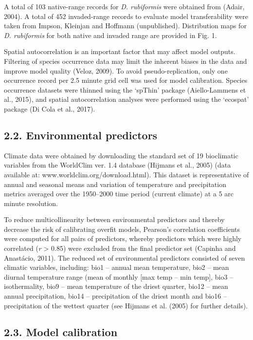 \documentclass[12pt,]{article}
\begin{document}
A total of 103 native-range records for \emph{D. rubiformis} were
obtained from (Adair, 2004). A total of 452 invaded-range records to
evaluate model transferability were taken from Impson, Kleinjan and
Hoffmann (unpublished). Distribution maps for \emph{D. rubiformis} for
both native and invaded range are provided in Fig. 1.

Spatial autocorrelation is an important factor that may affect model
outputs. Filtering of species occurrence data may limit the inherent
biases in the data and improve model quality (Veloz, 2009). To avoid
pseudo-replication, only one occurrence record per 2.5 minute grid cell
was used for model calibration. Species occurrence datasets were thinned
using the `spThin' package (Aiello-Lammens et al., 2015), and spatial
autocorrelation analyses were performed using the `ecospat' package (Di
Cola et al., 2017).

\hypertarget{environmental-predictors}{%
\subsection{2.2. Environmental
predictors}\label{environmental-predictors}}

Climate data were obtained by downloading the standard set of 19
bioclimatic variables from the WorldClim ver. 1.4 database (Hijmans et
al., 2005) (data available at: www.worldclim.org/download.html). This
dataset is representative of annual and seasonal means and variation of
temperature and precipitation metrics averaged over the 1950--2000 time
period (current climate) at a 5 arc minute resolution.

To reduce multicollinearity between environmental predictors and thereby
decrease the risk of calibrating overfit models, Pearson's correlation
coefficients were computed for all pairs of predictors, whereby
predictors which were highly correlated (\textbar{}\emph{r}\textbar{}
\textgreater{} 0.85) were excluded from the final predictor set (Capinha
and Anastácio, 2011). The reduced set of environmental predictors
consisted of seven climatic variables, including: bio1 -- annual mean
temperature, bio2 -- mean diurnal temperature range (mean of monthly
{[}max temp -- min temp{]}, bio3 -- isothermality, bio9 -- mean
temperature of the driest quarter, bio12 -- mean annual precipitation,
bio14 -- precipitation of the driest month and bio16 -- precipitation of
the wettest quarter (see Hijmans et al. (2005) for further details).

\hypertarget{model-calibration}{%
\subsection{2.3. Model calibration}\label{model-calibration}}
\end{document}
